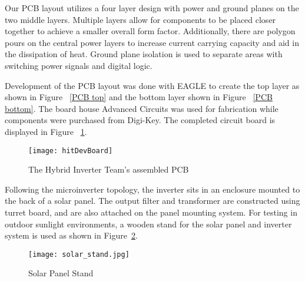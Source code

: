 Our PCB layout utilizes a four layer design with power and ground planes on the two middle layers. Multiple layers allow for components to be placed closer together to achieve a smaller overall form factor. Additionally, there are polygon pours on the central power layers to increase current carrying capacity and aid in the dissipation of heat. Ground plane isolation is used to separate areas with switching power signals and digital logic.

Development of the PCB layout was done with EAGLE to create the top layer as shown in Figure ~\ref{PCB top} and the bottom layer shown in Figure ~\ref{PCB bottom}. The board house Advanced Circuits was used for fabrication while components were purchased from Digi-Key. The completed circuit board is displayed in Figure ~\ref{hybrid_PCB}. 
 

\begin{figure}
\centering
\texttt{[image: hitDevBoard]}
\caption{The Hybrid Inverter Team's assembled PCB}
\label{hybrid_PCB}
\end{figure}


Following the microinverter topology, the inverter sits in an enclosure mounted to the back of a solar panel. The output filter and transformer are constructed using turret board, and are also attached on the panel mounting system. For testing in outdoor sunlight environments, a wooden stand for the solar panel and inverter system is used as shown in Figure~\ref{solar stand}.

\begin{figure}
\centering
\texttt{[image: solar\_stand.jpg]}
\caption{Solar Panel Stand}
\label{solar stand}
\end{figure}

